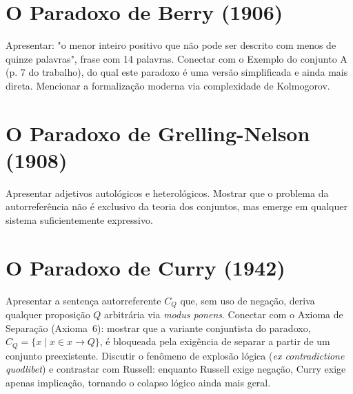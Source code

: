 
\section{O Paradoxo de Berry (1906)}

Apresentar: "o menor inteiro positivo que não pode ser descrito com
menos de quinze palavras", frase com 14 palavras.
Conectar com o Exemplo do conjunto A (p. 7 do trabalho), do qual
este paradoxo é uma versão simplificada e ainda mais direta.
Mencionar a formalização moderna via complexidade de Kolmogorov.


\section{O Paradoxo de Grelling-Nelson (1908)}

Apresentar adjetivos autológicos e heterológicos.
Mostrar que o problema da autorreferência não é exclusivo da teoria
dos conjuntos, mas emerge em qualquer sistema suficientemente expressivo.


\section{O Paradoxo de Curry (1942)}

Apresentar a sentença autorreferente \(C_Q\) que, sem uso de negação,
deriva qualquer proposição \(Q\) arbitrária via \textit{modus ponens}.
Conectar com o Axioma de Separação (Axioma~6): mostrar que a
variante conjuntista do paradoxo, \(C_Q = \{x \mid x \in x
    \rightarrow Q\}\), é bloqueada pela exigência de separar a partir
de um conjunto preexistente. Discutir o fenômeno de explosão
lógica (\textit{ex contradictione quodlibet}) e contrastar com
Russell: enquanto Russell exige negação, Curry exige apenas
implicação, tornando o colapso lógico ainda mais geral.


